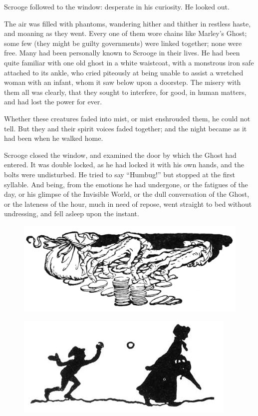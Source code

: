 \documentclass[paper=5.5in:8.5in,BCOR=5mm,twoside,DIV=calc,12pt,usegeometry]{scrbook} %
\begin{document}
Scrooge followed to the window: desperate in his curiosity. He looked out.

The air was filled with phantoms, wandering hither and thither in restless haste, and moaning as they went. Every one of them wore chains like Marley's Ghost; some few (they might be guilty governments) were linked together; none were free. Many had been personally known to Scrooge in their lives. He had been quite familiar with one old ghost in a white waistcoat, with a monstrous iron safe attached to its ankle, who cried piteously at being unable to assist a wretched woman with an infant, whom it saw below upon a doorstep. The misery with them all was clearly, that they sought to interfere, for good, in human matters, and had lost the power for ever.

Whether these creatures faded into mist, or mist enshrouded them, he could not tell. But they and their spirit voices faded together; and the night became as it had been when he walked home.

Scrooge closed the window, and examined the door by which the Ghost had entered. It was double locked, as he had locked it with his own hands, and the bolts were undisturbed. He tried to say \enquote{Humbug!} but stopped at the first syllable. And being, from the emotions he had undergone, or the fatigues of the day, or his glimpse of the Invisible World, or the dull conversation of the Ghost, or the lateness of the hour, much in need of repose, went straight to bed without undressing, and fell asleep upon the instant.

\begin{figure}[bh]
\centering
\includegraphics[width=.7\linewidth]{handsmoney}
\end{figure}


\begin{figure}[h]
\centering
\includegraphics[width=.8\linewidth]{gs012}
\end{figure}
\end{document}
